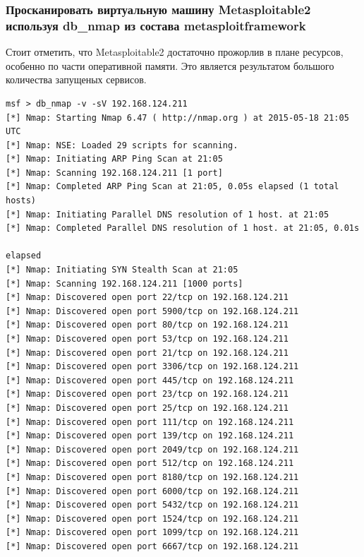 \documentclass[a4paper, 12pt]{article}		%
\begin{document}
\newpage
\subsubsection{Просканировать виртуальную машину Metasploitable2 используя db\_nmap из состава metasploit\-framework}




Стоит отметить, что Metasploitable2 достаточно прожорлив в плане ресурсов, особенно по части оперативной памяти. Это является результатом большого количества запущеных сервисов.

\begin{Verbatim}[frame=single]
msf > db_nmap -v -sV 192.168.124.211
[*] Nmap: Starting Nmap 6.47 ( http://nmap.org ) at 2015-05-18 21:05 UTC
[*] Nmap: NSE: Loaded 29 scripts for scanning.
[*] Nmap: Initiating ARP Ping Scan at 21:05
[*] Nmap: Scanning 192.168.124.211 [1 port]
[*] Nmap: Completed ARP Ping Scan at 21:05, 0.05s elapsed (1 total hosts)
[*] Nmap: Initiating Parallel DNS resolution of 1 host. at 21:05
[*] Nmap: Completed Parallel DNS resolution of 1 host. at 21:05, 0.01s
                                                                      elapsed
[*] Nmap: Initiating SYN Stealth Scan at 21:05
[*] Nmap: Scanning 192.168.124.211 [1000 ports]
[*] Nmap: Discovered open port 22/tcp on 192.168.124.211
[*] Nmap: Discovered open port 5900/tcp on 192.168.124.211
[*] Nmap: Discovered open port 80/tcp on 192.168.124.211
[*] Nmap: Discovered open port 53/tcp on 192.168.124.211
[*] Nmap: Discovered open port 21/tcp on 192.168.124.211
[*] Nmap: Discovered open port 3306/tcp on 192.168.124.211
[*] Nmap: Discovered open port 445/tcp on 192.168.124.211
[*] Nmap: Discovered open port 23/tcp on 192.168.124.211
[*] Nmap: Discovered open port 25/tcp on 192.168.124.211
[*] Nmap: Discovered open port 111/tcp on 192.168.124.211
[*] Nmap: Discovered open port 139/tcp on 192.168.124.211
[*] Nmap: Discovered open port 2049/tcp on 192.168.124.211
[*] Nmap: Discovered open port 512/tcp on 192.168.124.211
[*] Nmap: Discovered open port 8180/tcp on 192.168.124.211
[*] Nmap: Discovered open port 6000/tcp on 192.168.124.211
[*] Nmap: Discovered open port 5432/tcp on 192.168.124.211
[*] Nmap: Discovered open port 1524/tcp on 192.168.124.211
[*] Nmap: Discovered open port 1099/tcp on 192.168.124.211
[*] Nmap: Discovered open port 6667/tcp on 192.168.124.211

\end{Verbatim}
\end{document}
